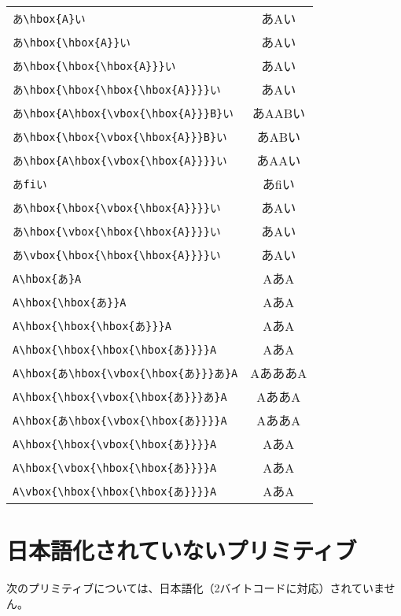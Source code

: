 \begin{tabular}{l@{ $\longrightarrow$ }c}
\verb|あ\hbox{A}い| & あ\hbox{A}い \\
\verb|あ\hbox{\hbox{A}}い| & あ\hbox{\hbox{A}}い \\
\verb|あ\hbox{\hbox{\hbox{A}}}い| & あ\hbox{\hbox{\hbox{A}}}い \\
\verb|あ\hbox{\hbox{\hbox{\hbox{A}}}}い| & あ\hbox{\hbox{\hbox{\hbox{A}}}}い \\
\verb|あ\hbox{A\hbox{\vbox{\hbox{A}}}B}い| &
					あ\hbox{A\hbox{\vbox{\hbox{A}}}B}い \\
\verb|あ\hbox{\hbox{\vbox{\hbox{A}}}B}い| &
					あ\hbox{\hbox{\vbox{\hbox{A}}}B}い \\
\verb|あ\hbox{A\hbox{\vbox{\hbox{A}}}}い| &
					あ\hbox{A\hbox{\vbox{\hbox{A}}}}い \\
\verb|あfiい| & あfiい \\
\verb|あ\hbox{\hbox{\vbox{\hbox{A}}}}い| &
					あ\hbox{\hbox{\vbox{\hbox{A}}}}い \\
\verb|あ\hbox{\vbox{\hbox{\hbox{A}}}}い| &
					あ\hbox{\vbox{\hbox{\hbox{A}}}}い \\
\verb|あ\vbox{\hbox{\hbox{\hbox{A}}}}い| &
					あ\vbox{\hbox{\hbox{\hbox{A}}}}い \\
\verb|A\hbox{あ}A| & A\hbox{あ}A \\
\verb|A\hbox{\hbox{あ}}A| & A\hbox{\hbox{あ}}A \\
\verb|A\hbox{\hbox{\hbox{あ}}}A| & A\hbox{\hbox{\hbox{あ}}}A \\
\verb|A\hbox{\hbox{\hbox{\hbox{あ}}}}A| & A\hbox{\hbox{\hbox{\hbox{あ}}}}A \\
\verb|A\hbox{あ\hbox{\vbox{\hbox{あ}}}あ}A| &
					A\hbox{あ\hbox{\vbox{\hbox{あ}}}あ}A \\
\verb|A\hbox{\hbox{\vbox{\hbox{あ}}}あ}A| &
					A\hbox{\hbox{\vbox{\hbox{あ}}}あ}A \\
\verb|A\hbox{あ\hbox{\vbox{\hbox{あ}}}}A| &
					A\hbox{あ\hbox{\vbox{\hbox{あ}}}}A \\
\verb|A\hbox{\hbox{\vbox{\hbox{あ}}}}A| &
					A\hbox{\hbox{\vbox{\hbox{あ}}}}A \\
\verb|A\hbox{\vbox{\hbox{\hbox{あ}}}}A| &
					A\hbox{\vbox{\hbox{\hbox{あ}}}}A \\
\verb|A\vbox{\hbox{\hbox{\hbox{あ}}}}A| &
					A\vbox{\hbox{\hbox{\hbox{あ}}}}A \\
\end{tabular}

\section{日本語化されていないプリミティブ}
次のプリミティブについては、日本語化（2バイトコードに対応）されていません。

